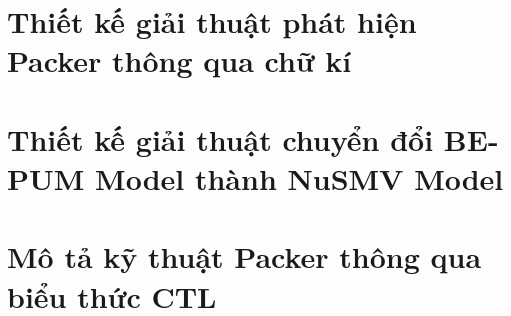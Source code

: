 \section{Thiết kế giải thuật phát hiện Packer thông qua chữ kí}

\section{Thiết kế giải thuật chuyển đổi BE-PUM Model thành NuSMV Model}

\section{Mô tả kỹ thuật Packer thông qua biểu thức CTL}